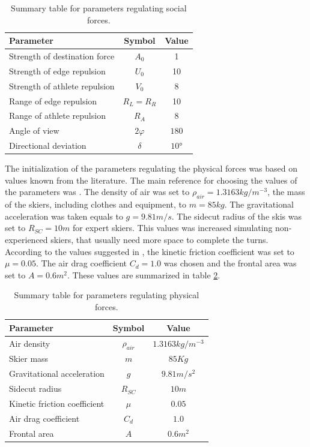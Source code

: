 \documentclass[12pt,a4paper,twoside]{book}
\begin{document}
\begin{table}
  \centering
  \begin{tabular}{ | l | c | c | }
    \hline
    Parameter & Symbol & Value \\
    \hline
    Strength of destination force & $A_0$ & 1 \\
    Strength of edge repulsion & $U_0$ & 10 \\
    Strength of athlete repulsion & $V_0$ & 8 \\
    Range of edge repulsion & $R_L=R_R$ & 10 \\
    Range of athlete repulsion & $R_A$ & 8 \\
    Angle of view & $2\varphi$ & $180$ \\
    Directional deviation & $\delta$ & $10°$ \\
    \hline
  \end{tabular}
  \caption{Summary table for parameters regulating social forces.}
  \label{social_parameters_table}
\end{table}

The initialization of the parameters regulating the physical forces was based on values known from the literature. The main reference for choosing the values of the parameters was \cite{hol2012}. The density of air was set to $\rho_{air}=1.3163 kg/m^{-3}$, the mass of the skiers, including clothes and equipment, to $m=85 kg$. The gravitational acceleration was taken equals to $g=9.81 m/s$. The sidecut radius of the skis was set to $R_{SC}=10 m$ for expert skiers. This values was increased simulating non-experienced skiers, that usually need more space to complete the turns. According to the values suggested in \cite{bu2004}, the kinetic friction coefficient was set to $\mu = 0.05$. The air drag coefficient $C_d = 1.0$ was chosen and the frontal area was set to $A=0.6 m^2$. These values are summarized in table \ref{physical_parameters_table}.

\begin{table}
  \centering
  \begin{tabular}{ | l | c | c |}
    \hline
    Parameter & Symbol & Value \\
    \hline
    Air density & $\rho_{air}$ & $1.3163 kg/m^{-3}$ \\
    Skier mass & $m$ & $85 Kg$ \\
    Gravitational acceleration & $g$ & $9.81 m/s^2$ \\
    Sidecut radius & $R_{SC}$ & $10m$ \\
    Kinetic friction coefficient & $\mu$ & $0.05$ \\
    Air drag coefficient & $C_d$ & $1.0$ \\
    Frontal area & $A$ & $0.6 m^2$ \\
    \hline
  \end{tabular}
  \caption{Summary table for parameters regulating physical forces.}
  \label{physical_parameters_table}
\end{table}
\end{document}
